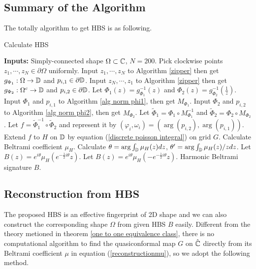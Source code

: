 \documentclass[review,onefignum,onetabnum]{siamonline190516}
\begin{document}
\subsection{Summary of the Algorithm}
    The totally algorithm to get HBS is as following.
    \begin{algorithm}[H]
    \caption{Calculate HBS}
    \label{alg all}
    \begin{algorithmic}
        \STATE \textbf{Inputs:} Simply-connected shape $\Omega \subset \mathbb{C}$, $N=200$.
        \STATE Pick clockwise points $z_1, \cdots, z_N \in \partial \Omega$ uniformly.
        \STATE Input $z_1, \cdots, z_N$ to Algorithm \ref{zipper} then get $g_{\Phi_1}: \Omega \rightarrow \mathbb{D}$ and $p_{i,1} \in \partial\mathbb{D}$.
        \STATE Input $z_N, \cdots, z_1$ to Algorithm \ref{zipper} then get $g_{\Phi_2}: \Omega^c \rightarrow \mathbb{D}$ and $p_{i,2} \in \partial\mathbb{D}$.
        \STATE Let $\Phi_1(z) = g_{\Phi_1}^{-1}(z)$ and $\Phi_2(z) = g_{\Phi_2}^{-1}(\frac{1}{z})$.
        \STATE Input $\Phi_1$ and $p_{i,1}$ to Algorithm \ref{alg norm phi1}, then get $M_{\Phi_1}$.
        \STATE Input $\Phi_2$ and $p_{i,2}$ to Algorithm \ref{alg norm phi2}, then get $M_{\Phi_2}$.
        \STATE Let $\tilde{\Phi}_1 = \Phi_1 \circ M_{\Phi_1}^{-1}$ and $\tilde{\Phi}_2 = \Phi_2 \circ M_{\Phi_2}$.
        \STATE Let $f = \tilde{\Phi}_1^{-1} \circ \tilde{\Phi}_2$ and represent it by $(\varphi_i, \omega_i) = (\arg(p_{i,2}), \arg(p_{i,1}))$.
        \STATE Extend $f$ to $H$ on $\mathbb{D}$ by equation (\ref{discrete poisson integral}) on grid $G$.
        \STATE Calculate Beltrami coefficient $\mu_{H}$.
        \STATE Calculate $\theta = \arg \int_{\mathbb{D}} \mu_H(z) dz$, $\theta' = \arg \int_{\mathbb{D}} \mu_H(z) / z dz$.
        \STATE Let $B(z) = e^{i \theta} \mu_{H}(e^{-\frac{1}{2}i\theta} z)$.
        \ELSE
        \STATE Let $B(z) = e^{i \theta} \mu_{H}(-e^{-\frac{1}{2}i\theta} z)$.
        \ENDIF
        \RETURN Harmonic Beltrami signature $B$.
    \end{algorithmic}
    \end{algorithm}

    \subsection{Reconstruction from HBS}
    The proposed HBS is an effective fingerprint of 2D shape and we can also construct the corresponding shape $\Omega$ from given HBS $B$ easily. Different from the theory metioned in theorem \ref{one to one equivalence class}, there is no computational algorithm to find the quasiconformal map $G$ on $\hat{\mathbb{C}}$ directly from its Beltrami coefficient $\mu$ in equation (\ref{reconstructionmu}), so we adopt the following method.
    
\end{document}
